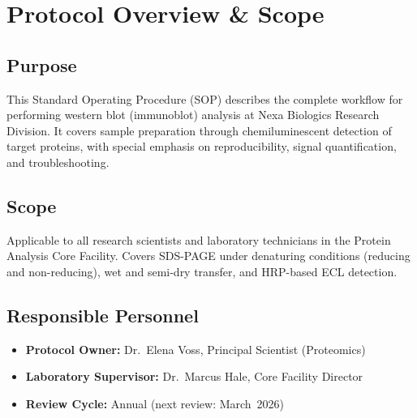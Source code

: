 
\section{Protocol Overview \& Scope}

\begin{minipage}[t]{0.62\textwidth}
\vspace{0pt}
\subsection*{Purpose}
This Standard Operating Procedure (SOP) describes the complete workflow for performing
western blot (immunoblot) analysis at Nexa Biologics Research Division. It covers
sample preparation through chemiluminescent detection of target proteins, with special
emphasis on reproducibility, signal quantification, and troubleshooting.

\medskip
\subsection*{Scope}
Applicable to all research scientists and laboratory technicians in the Protein
Analysis Core Facility. Covers SDS-PAGE under denaturing conditions (reducing and
non-reducing), wet and semi-dry transfer, and HRP-based ECL detection.

\medskip
\subsection*{Responsible Personnel}
\begin{itemize}
  \item \textbf{Protocol Owner:} Dr.~Elena Voss, Principal Scientist (Proteomics)
  \item \textbf{Laboratory Supervisor:} Dr.~Marcus Hale, Core Facility Director
  \item \textbf{Review Cycle:} Annual (next review: March~2026)
\end{itemize}
\end{minipage}%
\hfill%
